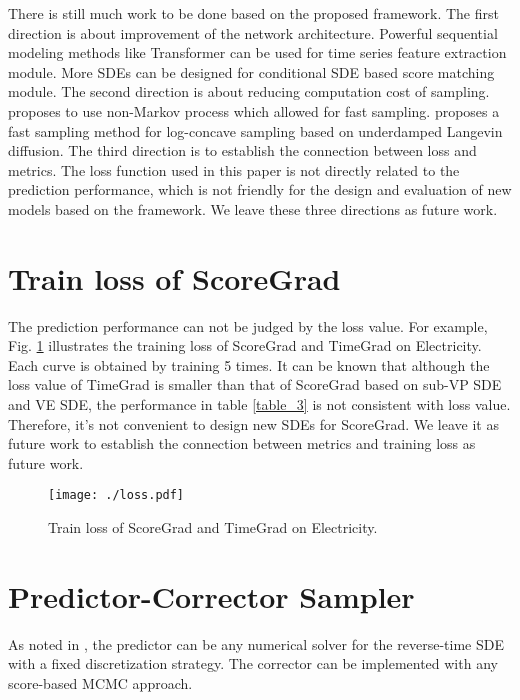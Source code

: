 There is still much work to be done based on the proposed framework. The first direction is about improvement of the network architecture. Powerful sequential modeling methods like Transformer can be used for time series feature extraction module. More SDEs can be designed for conditional SDE based score matching module. The second direction is about reducing computation cost of sampling. \cite{song2020denoising} proposes to use non-Markov process which allowed for fast sampling. \cite{shen2019randomized} proposes a fast sampling method for log-concave sampling based on underdamped Langevin diffusion. The third direction is to establish the connection between loss and metrics. The loss function  used in this paper is not directly related to the prediction performance, which is not friendly for the design and evaluation of new models based on the framework. %
We leave these three directions as future work.

\appendices
\section{Train loss of ScoreGrad}\label{app_loss}
The prediction performance can not be judged by the loss value. For example, Fig. \ref{loss} illustrates the training loss of ScoreGrad and TimeGrad on Electricity. Each curve is obtained by training 5 times. It can be known that although the loss value of TimeGrad is smaller than that of ScoreGrad based on sub-VP SDE and VE SDE, the performance in table \ref{table_3} is not consistent with loss value. Therefore, it's not convenient to design new SDEs for ScoreGrad. We leave it as future work to establish the connection between metrics and training loss as future work.

\begin{figure}[t]
	\centering
	\texttt{[image: ./loss.pdf]} 
	\caption{Train loss of ScoreGrad and TimeGrad on Electricity.} %
	\label{loss}
\end{figure}

\section{Predictor-Corrector Sampler}\label{prd_cor}
As noted in \cite{song2020score}, the predictor can be any numerical solver for the reverse-time SDE with a fixed discretization strategy. The corrector can be implemented with any score-based MCMC approach. 


